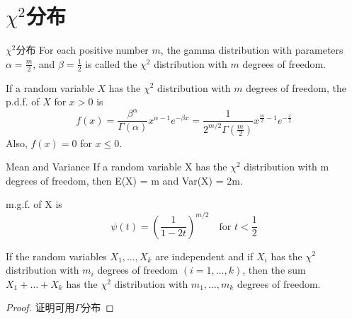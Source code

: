 \documentclass[../../main.tex]{subfiles}
\begin{document}
\section{$\chi^2$分布}

\begin{definition}{$\chi^2$分布}{}
For each positive number $m$, the gamma distribution with parameters $\alpha=\frac{m}{2}$, and $\beta=\frac{1}{2}$ is called the $\chi^2$ distribution with $m$ degrees of freedom. 

If a random variable $X$ has the $\chi^2$ distribution with $m$ degrees of freedom, the p.d.f. of $X$ for $x > 0$ is
\begin{equation}\label{}
f(x)=\frac{\beta^\alpha}{\Gamma(\alpha)} x^{\alpha-1}e^{-\beta x}=\frac{1}{2^{m/2}\Gamma(\frac{m}{2})}x^{\frac{m}{2}-1}e^{-\frac{x}{2}}
\end{equation}
Also, $f (x) = 0$ for $x \leqslant 0$.
\end{definition}

\begin{theorem}{Mean and Variance}
If a random variable X has the $\chi^2$ distribution with m degrees of
freedom, then E(X) = m and Var(X) = 2m.
\end{theorem}
m.g.f. of X is
\begin{equation}\label{}
\psi(t)=(\frac{1}{1-2t})^{m/2} \quad\text{for $t<\frac{1}{2}$}
\end{equation}

\begin{theorem}{}{}
If the random variables $X_1, \dots, X_k$ are independent and if $X_i$ has the $\chi^2$ distribution with $m_i$ degrees of freedom $(i = 1, \dots, k)$, then the sum $X_1 + \dots + X_k$ has the $\chi^2$ distribution with $m_1, \dots, m_k$ degrees of freedom.
\end{theorem}
\begin{proof}
证明可用$\Gamma$分布
\end{proof}
\end{document}
